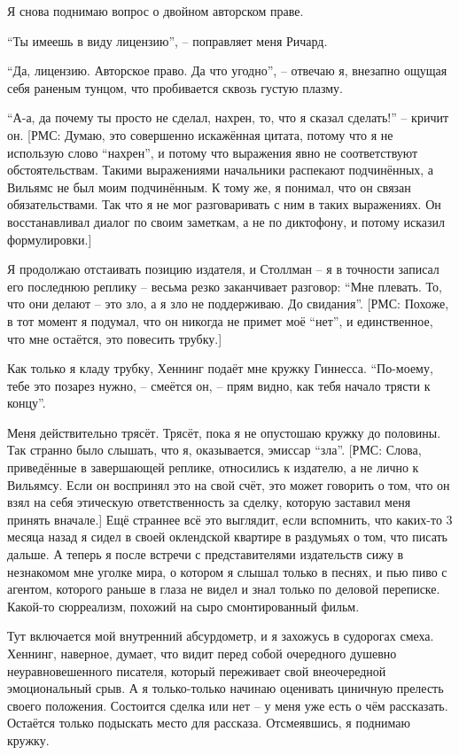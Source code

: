 Я снова поднимаю вопрос о двойном авторском праве.

\enquote{Ты имеешь в виду лицензию}, -- поправляет меня Ричард.

\enquote{Да, лицензию. Авторское право. Да что угодно}, -- отвечаю я, внезапно ощущая себя раненым тунцом, что пробивается сквозь густую плазму.

\enquote{А-а, да почему ты просто не сделал, нахрен, то, что я сказал сделать!} -- кричит он. [РМС: Думаю, это совершенно искажённая цитата, потому что я не использую слово \enquote{нахрен}, и потому что выражения явно не соответствуют обстоятельствам. Такими выражениями начальники распекают подчинённых, а Вильямс не был моим подчинённым. К тому же, я понимал, что он связан обязательствами. Так что я не мог разговаривать с ним в таких выражениях. Он восстанавливал диалог по своим заметкам, а не по диктофону, и потому исказил формулировки.]

Я продолжаю отстаивать позицию издателя, и Столлман -- я в точности записал его последнюю реплику -- весьма резко заканчивает разговор: \enquote{Мне плевать. То, что они делают -- это зло, а я зло не поддерживаю. До свидания}. [РМС: Похоже, в тот момент я подумал, что он никогда не примет моё \enquote{нет}, и единственное, что мне остаётся, это повесить трубку.]

Как только я кладу трубку, Хеннинг подаёт мне кружку Гиннесса. \enquote{По-моему, тебе это позарез нужно, -- смеётся он, -- прям видно, как тебя начало трясти к концу}.

Меня действительно трясёт. Трясёт, пока я не опустошаю кружку до половины. Так странно было слышать, что я, оказывается, эмиссар \enquote{зла}. [РМС: Слова, приведённые в завершающей реплике, относились к издателю, а не лично к Вильямсу. Если он воспринял это на свой счёт, это может говорить о том, что он взял на себя этическую ответственность за сделку, которую заставил меня принять вначале.] Ещё страннее всё это выглядит, если вспомнить, что каких-то 3 месяца назад я сидел в своей оклендской квартире в раздумьях о том, что писать дальше. А теперь я после встречи с представителями издательств сижу в незнакомом мне уголке мира, о котором я слышал только в песнях, и пью пиво с агентом, которого раньше в глаза не видел и знал только по деловой переписке. Какой-то сюрреализм, похожий на сыро смонтированный фильм.

Тут включается мой внутренний абсурдометр, и я захожусь в судорогах смеха. Хеннинг, наверное, думает, что видит перед собой очередного душевно неуравновешенного писателя, который переживает свой внеочередной эмоциональный срыв. А я только-только начинаю оценивать циничную прелесть своего положения. Состоится сделка или нет -- у меня уже есть о чём рассказать. Остаётся только подыскать место для рассказа. Отсмеявшись, я поднимаю кружку.

